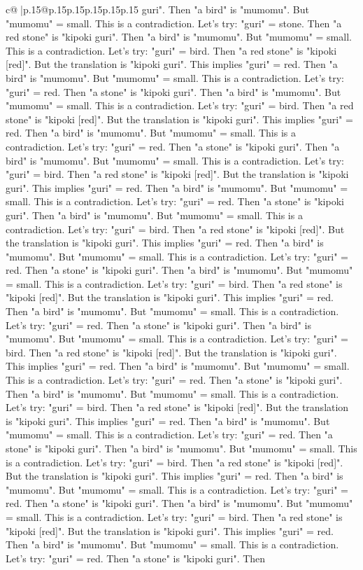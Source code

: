 \documentclass{article}
\begin{document}
{\begin{supertabular}{c@{$\;$}|p{.15\linewidth}@{}p{.15\linewidth}p{.15\linewidth}p{.15\linewidth}p{.15\linewidth}p{.15\linewidth}}
{{{guri". Then "a bird" is "mumomu". But "mumomu" = small. This is a contradiction. Let's try: "guri" = stone. Then "a red stone" is "kipoki guri". Then "a bird" is "mumomu". But "mumomu" = small. This is a contradiction. Let's try: "guri" = bird. Then "a red stone" is "kipoki {[}red{]}". But the translation is "kipoki guri". This implies "guri" = red. Then "a bird" is "mumomu". But "mumomu" = small. This is a contradiction. Let's try: "guri" = red. Then "a stone" is "kipoki guri". Then "a bird" is "mumomu". But "mumomu" = small. This is a contradiction. Let's try: "guri" = bird. Then "a red stone" is "kipoki {[}red{]}". But the translation is "kipoki guri". This implies "guri" = red. Then "a bird" is "mumomu". But "mumomu" = small. This is a contradiction. Let's try: "guri" = red. Then "a stone" is "kipoki guri". Then "a bird" is "mumomu". But "mumomu" = small. This is a contradiction. Let's try: "guri" = bird. Then "a red stone" is "kipoki {[}red{]}". But the translation is "kipoki guri". This implies "guri" = red. Then "a bird" is "mumomu". But "mumomu" = small. This is a contradiction. Let's try: "guri" = red. Then "a stone" is "kipoki guri". Then "a bird" is "mumomu". But "mumomu" = small. This is a contradiction. Let's try: "guri" = bird. Then "a red stone" is "kipoki {[}red{]}". But the translation is "kipoki guri". This implies "guri" = red. Then "a bird" is "mumomu". But "mumomu" = small. This is a contradiction. Let's try: "guri" = red. Then "a stone" is "kipoki guri". Then "a bird" is "mumomu". But "mumomu" = small. This is a contradiction. Let's try: "guri" = bird. Then "a red stone" is "kipoki {[}red{]}". But the translation is "kipoki guri". This implies "guri" = red. Then "a bird" is "mumomu". But "mumomu" = small. This is a contradiction. Let's try: "guri" = red. Then "a stone" is "kipoki guri". Then "a bird" is "mumomu". But "mumomu" = small. This is a contradiction. Let's try: "guri" = bird. Then "a red stone" is "kipoki {[}red{]}". But the translation is "kipoki guri". This implies "guri" = red. Then "a bird" is "mumomu". But "mumomu" = small. This is a contradiction. Let's try: "guri" = red. Then "a stone" is "kipoki guri". Then "a bird" is "mumomu". But "mumomu" = small. This is a contradiction. Let's try: "guri" = bird. Then "a red stone" is "kipoki {[}red{]}". But the translation is "kipoki guri". This implies "guri" = red. Then "a bird" is "mumomu". But "mumomu" = small. This is a contradiction. Let's try: "guri" = red. Then "a stone" is "kipoki guri". Then "a bird" is "mumomu". But "mumomu" = small. This is a contradiction. Let's try: "guri" = bird. Then "a red stone" is "kipoki {[}red{]}". But the translation is "kipoki guri". This implies "guri" = red. Then "a bird" is "mumomu". But "mumomu" = small. This is a contradiction. Let's try: "guri" = red. Then "a stone" is "kipoki guri". Then "a bird" is "mumomu". But "mumomu" = small. This is a contradiction. Let's try: "guri" = bird. Then "a red stone" is "kipoki {[}red{]}". But the translation is "kipoki guri". This implies "guri" = red. Then "a bird" is "mumomu". But "mumomu" = small. This is a contradiction. Let's try: "guri" = red. Then "a stone" is "kipoki guri". Then }}}
\end{supertabular}}
\end{document}
